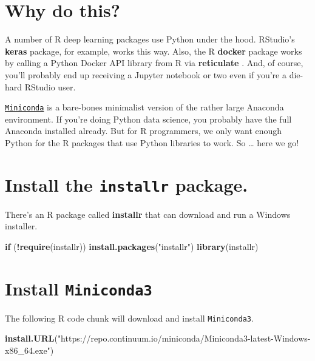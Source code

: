 \documentclass[]{book}
\newenvironment{Shaded}{\begin{snugshade}}{\end{snugshade}}
\newcommand{\ControlFlowTok}[1]{\textcolor[rgb]{0.13,0.29,0.53}{\textbf{#1}}}
\newcommand{\KeywordTok}[1]{\textcolor[rgb]{0.13,0.29,0.53}{\textbf{#1}}}
\newcommand{\NormalTok}[1]{#1}
\newcommand{\OperatorTok}[1]{\textcolor[rgb]{0.81,0.36,0.00}{\textbf{#1}}}
\newcommand{\StringTok}[1]{\textcolor[rgb]{0.31,0.60,0.02}{#1}}
\theoremstyle{definition}
\theoremstyle{definition}
\theoremstyle{definition}
\theoremstyle{remark}
\begin{document}
\hypertarget{why-do-this}{%
\section{Why do this?}\label{why-do-this}}

A number of R deep learning packages use Python under the hood.
RStudio's \textbf{keras} \citep{R-keras} package, for example, works
this way. Also, the R \textbf{docker} \citep{R-docker} package works by
calling a Python Docker API library from R via \textbf{reticulate}
\citep{R-reticulate}. And, of course, you'll probably end up receiving a
Jupyter notebook or two even if you're a die-hard RStudio user.

\href{https://conda.io/miniconda.html}{\texttt{Miniconda}} is a
bare-bones minimalist version of the rather large Anaconda environment.
If you're doing Python data science, you probably have the full Anaconda
installed already. But for R programmers, we only want enough Python for
the R packages that use Python libraries to work. So \ldots{} here we
go!

\hypertarget{install-the-installr-package.}{%
\section{\texorpdfstring{Install the \texttt{installr}
package.}{Install the installr package.}}\label{install-the-installr-package.}}

There's an R package called \textbf{installr} \citep{R-installr} that
can download and run a Windows installer.

\begin{Shaded}
\begin{Highlighting}[]
\ControlFlowTok{if}\NormalTok{ (}\OperatorTok{!}\KeywordTok{require}\NormalTok{(installr)) }\KeywordTok{install.packages}\NormalTok{(}\StringTok{"installr"}\NormalTok{)}
\KeywordTok{library}\NormalTok{(installr)}
\end{Highlighting}
\end{Shaded}

\hypertarget{install-miniconda3}{%
\section{\texorpdfstring{Install
\texttt{Miniconda3}}{Install Miniconda3}}\label{install-miniconda3}}

The following R code chunk will download and install
\texttt{Miniconda3}.

\begin{Shaded}
\begin{Highlighting}[]
\KeywordTok{install.URL}\NormalTok{(}\StringTok{"https://repo.continuum.io/miniconda/Miniconda3-latest-Windows-x86_64.exe"}\NormalTok{)}
\end{Highlighting}
\end{Shaded}
\end{document}
